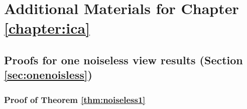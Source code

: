 
\chapter{Additional Materials for Chapter \ref{chapter:ica}}

\section{Proofs for one noiseless view results (Section \ref{sec:onenoisless})}
\label{appendix:thm_noiseless}

\subsection{Proof of Theorem \ref{thm:noiseless1}}\label{appendix:proof-thm1}

